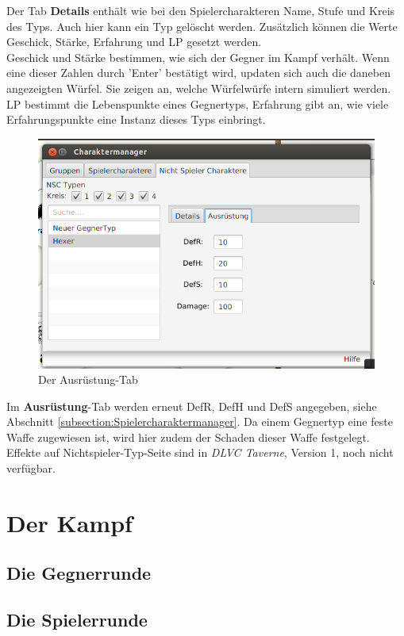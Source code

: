 \documentclass[11pt, a4paper, german]{article}
\begin{document}
Der Tab \textbf{Details} enthält wie bei den Spielercharakteren Name, Stufe und Kreis des Typs. Auch hier kann ein Typ gelöscht werden. 
Zusätzlich können die Werte Geschick, Stärke, Erfahrung und LP gesetzt werden.\\
 Geschick und Stärke bestimmen, wie sich der Gegner im Kampf verhält. Wenn eine dieser Zahlen durch 'Enter' bestätigt wird, updaten sich auch die daneben angezeigten Würfel. 
Sie zeigen an, welche Würfelwürfe intern simuliert werden. LP bestimmt die Lebenspunkte eines Gegnertyps, Erfahrung gibt an, wie viele Erfahrungspunkte eine Instanz dieses Typs einbringt.\\
\begin{figure}
\centering
\includegraphics[width=1\linewidth]{Bilder/Nichtspielertypmanager2}
\caption{Der Ausrüstung-Tab}
\label{fig:Nichtspielertypmanager2}
\end{figure}

Im \textbf{Ausrüstung}-Tab werden erneut DefR, DefH und DefS angegeben, siehe Abschnitt \ref{subsection:Spielercharaktermanager}. 
Da einem Gegnertyp eine feste Waffe zugewiesen ist, wird hier zudem der Schaden dieser Waffe festgelegt. Effekte auf Nichtspieler-Typ-Seite sind in \textit{DLVC Taverne}, Version 1, noch nicht verfügbar.

\section{Der Kampf}
\subsection{Die Gegnerrunde}
\subsection{Die Spielerrunde}
\end{document}
